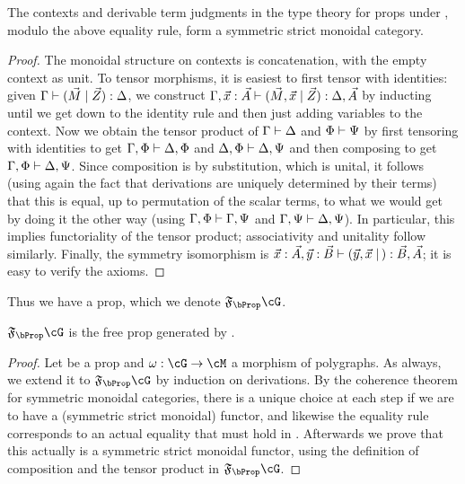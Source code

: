 \begin{props}
\begin{thm}\label{thm:prop-moncat}
  The contexts and derivable term judgments in the type theory for props under \cG, modulo the above equality rule, form a symmetric strict monoidal category.
\end{thm}
\begin{proof}
  The monoidal structure on contexts is concatenation, with the empty context as unit.
  To tensor morphisms, it is easiest to first tensor with identities: given $\Gamma\vdash (\vec M\mid \vec Z):\Delta$, we construct $\Gamma,\vec x:\vec A\vdash (\vec M,\vec x\mid \vec Z):\Delta,\vec A$ by inducting until we get down to the identity rule and then just adding variables to the context.
  Now we obtain the tensor product of $\Gamma\vdash \Delta$ and $\Phi\vdash \Psi$ by first tensoring with identities to get $\Gamma,\Phi \vdash \Delta,\Phi$ and $\Delta,\Phi\vdash \Delta,\Psi$ and then composing to get $\Gamma,\Phi\vdash \Delta,\Psi$.
  Since composition is by substitution, which is unital, it follows (using again the fact that derivations are uniquely determined by their terms) that this is equal, up to permutation of the scalar terms, to what we would get by doing it the other way (using $\Gamma,\Phi\vdash \Gamma,\Psi$ and $\Gamma,\Psi\vdash \Delta,\Psi$).
  In particular, this implies functoriality of the tensor product; associativity and unitality follow similarly.
  Finally, the symmetry isomorphism is $\vec x:\vec A, \vec y:\vec B \vdash (\vec y,\vec x \mid\,) : \vec B,\vec A$; it is easy to verify the axioms.
\end{proof}

Thus we have a prop, which we denote $\F\bProp\cG$.

\begin{thm}\label{thm:prop-initial}
  $\F\bProp\cG$ is the free prop generated by \cG.
\end{thm}
\begin{proof}
  Let \cM be a prop and $\pfree:\cG\to \cM$ a morphism of polygraphs.
  As always, we extend it to $\F\bProp\cG$ by induction on derivations.
  By the coherence theorem for symmetric monoidal categories, there is a unique choice at each step if we are to have a (symmetric strict monoidal) functor, and likewise the equality rule corresponds to an actual equality that must hold in \cM.
  Afterwards we prove that this actually is a symmetric strict monoidal functor, using the definition of composition and the tensor product in $\F\bProp\cG$.
\end{proof}


\end{props}
